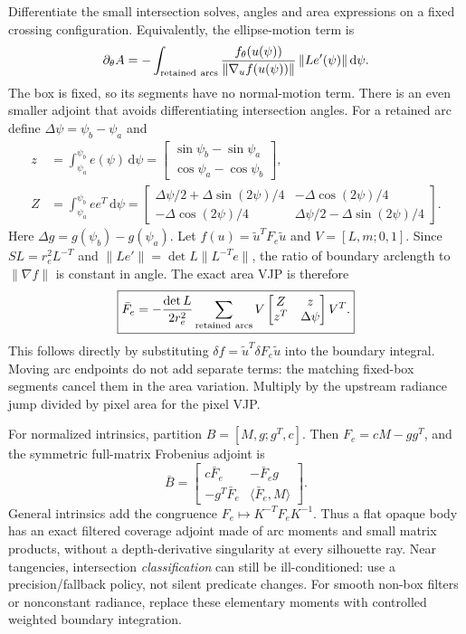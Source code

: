 \documentclass[10pt,letterpaper]{article}
\theoremstyle{remark}\newtheorem{counterexample}[proposition]{Counterexample}
\newcommand{\dd}{\,\mathrm d}
\newcommand{\ip}[2]{\langle #1,#2\rangle}
\begin{document}
Differentiate the small intersection solves, angles and area expressions on a fixed crossing configuration. Equivalently, the ellipse-motion term is
\begin{equation}
 \partial_\theta A=-\int_{\rm retained\ arcs}
 \frac{f_\theta(u(\psi))}{\|\nabla_uf(u(\psi))\|}\,\|Le'(\psi)\|\dd\psi.
\end{equation}
The box is fixed, so its segments have no normal-motion term. There is an even smaller adjoint that avoids differentiating intersection angles. For a retained arc define $\Delta\psi=\psi_b-\psi_a$ and
\begin{align}
 z&=\int_{\psi_a}^{\psi_b}e(\psi)\dd\psi
   =\begin{bmatrix}\sin\psi_b-\sin\psi_a\\ \cos\psi_a-\cos\psi_b\end{bmatrix},\\
 Z&=\int_{\psi_a}^{\psi_b}ee^T\dd\psi
 =\begin{bmatrix}\Delta\psi/2+\Delta\sin(2\psi)/4&-\Delta\cos(2\psi)/4\\
 -\Delta\cos(2\psi)/4&\Delta\psi/2-\Delta\sin(2\psi)/4\end{bmatrix}.
\end{align}
Here $\Delta g=g(\psi_b)-g(\psi_a)$. Let $f(u)=\widetilde u^TF_e\widetilde u$ and $V=[L,m;0,1]$. Since $SL=r_e^2L^{-T}$ and $\|Le'\|=\det L\|L^{-T}e\|$, the ratio of boundary arclength to $\|\nabla f\|$ is constant in angle. The exact area VJP is therefore
\begin{equation}
 \boxed{\bar F_e=-\frac{\det L}{2r_e^2}\sum_{\rm retained\ arcs}
 V\begin{bmatrix}Z&z\\z^T&\Delta\psi\end{bmatrix}V^T.} \label{eq:conicmoment}
\end{equation}
This follows directly by substituting $\delta f=\widetilde u^T\delta F_e\widetilde u$ into the boundary integral. Moving arc endpoints do not add separate terms: the matching fixed-box segments cancel them in the area variation. Multiply by the upstream radiance jump divided by pixel area for the pixel VJP.

For normalized intrinsics, partition $B=[M,g;g^T,c]$. Then $F_e=cM-gg^T$, and the symmetric full-matrix Frobenius adjoint is
\begin{equation}
 \bar B=\begin{bmatrix}c\bar F_e&-\bar F_eg\\-g^T\bar F_e&\ip{\bar F_e}{M}\end{bmatrix}. \label{eq:conictoquad}
\end{equation}
General intrinsics add the congruence $F_e\mapsto K^{-T}F_eK^{-1}$. Thus a flat opaque body has an exact filtered coverage adjoint made of arc moments and small matrix products, without a depth-derivative singularity at every silhouette ray. Near tangencies, intersection \emph{classification} can still be ill-conditioned: use a precision/fallback policy, not silent predicate changes. For smooth non-box filters or nonconstant radiance, replace these elementary moments with controlled weighted boundary integration.
\end{document}
